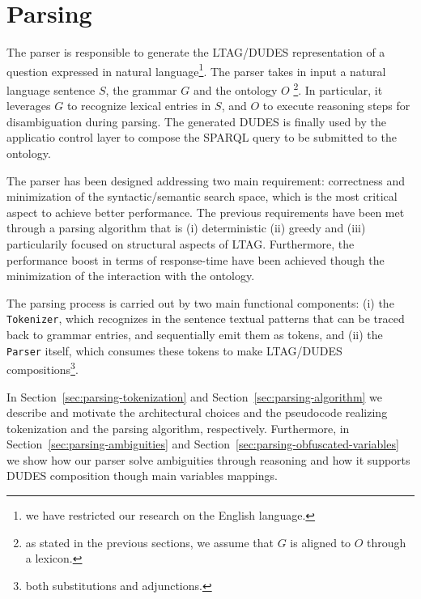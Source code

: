 \section{Parsing}
\label{sec:parsing}

The parser is responsible to generate the LTAG/DUDES representation of a question expressed in natural language\footnote{we have restricted our research on the English language.}. 
%
The parser takes in input a natural language sentence $S$, the grammar $G$ and the ontology $O$ \footnote{as stated in the previous sections, we assume that $G$ is aligned to $O$ through a lexicon.}.
%
In particular, it leverages $G$ to recognize lexical entries in $S$, and $O$ to execute reasoning steps for disambiguation during parsing.
%
The generated DUDES is finally used by the applicatio control layer to compose the SPARQL query to be submitted to the ontology.


The parser has been designed addressing two main requirement: correctness and minimization of the syntactic/semantic search space, which is the most critical aspect to achieve better performance.
%
The previous requirements have been met through a parsing algorithm that is (i) deterministic (ii) greedy and (iii) particularily focused on structural aspects of LTAG.
Furthermore, the performance boost in terms of response-time have been achieved though the minimization of the interaction with the ontology.

The parsing process is carried out by two main functional components: 
(i) the \texttt{Tokenizer}, which recognizes in the sentence textual patterns that can be traced back to grammar entries, and sequentially emit them as tokens, and 
(ii) the \texttt{Parser} itself, which consumes these tokens to make LTAG/DUDES compositions\footnote{both substitutions and adjunctions.}.

In Section~\ref{sec:parsing-tokenization} and Section~\ref{sec:parsing-algorithm} we describe and motivate the architectural choices and the pseudocode realizing tokenization and the parsing algorithm, respectively.
%
Furthermore, in Section~\ref{sec:parsing-ambiguities} and Section~\ref{sec:parsing-obfuscated-variables} we show how our parser solve ambiguities through reasoning and how it supports DUDES composition though main variables mappings.




